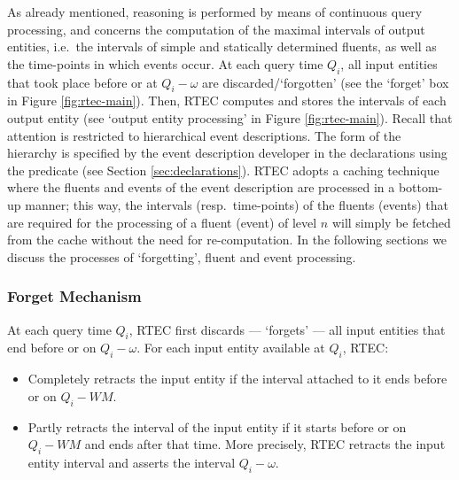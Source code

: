 As already mentioned, reasoning is performed by means of continuous query processing, and concerns the computation of the maximal intervals of output entities, i.e.~the intervals of simple and statically determined fluents, as well as the time-points in which events occur. At each query time $Q_i$, all input entities that took place before or at $Q_i{-}\omega$ are discarded/`forgotten' (see the `forget' box in Figure \ref{fig:rtec-main}).  
Then, RTEC computes and stores the intervals of each output entity (see `output entity processing' in Figure \ref{fig:rtec-main}). Recall that attention is restricted to hierarchical event descriptions. The form of the hierarchy is specified by the event description developer in the declarations using the  predicate (see Section \ref{sec:declarations}).
%
RTEC adopts a caching technique where the fluents and events of the event description are processed in a bottom-up manner; this way, the intervals (resp.~time-points) of the fluents (events) that are required for the processing of a fluent (event) of level $n$ will simply be fetched from the cache without the need for re-computation. %
In the following sections we discuss the processes of `forgetting', fluent and event processing. 

\subsubsection{Forget Mechanism}

At each query time $Q_i$, RTEC first discards --- `forgets' --- all input entities that end before or on $\mathit{Q_i{-}\omega}$. For each input entity available at $Q_i$, RTEC:
%
\begin{itemize}
 \item Completely retracts the input entity if the interval attached to it ends before or on $\mathit{Q_i{-}WM}$.
 \item Partly retracts the interval of the input entity if it starts before or on $\mathit{Q_i{-}WM}$ and ends after that time. More precisely, RTEC retracts the input entity interval  and asserts the interval \textttsmall{(}$\mathit{Q_i{-}\omega}$. 
\end{itemize}   

